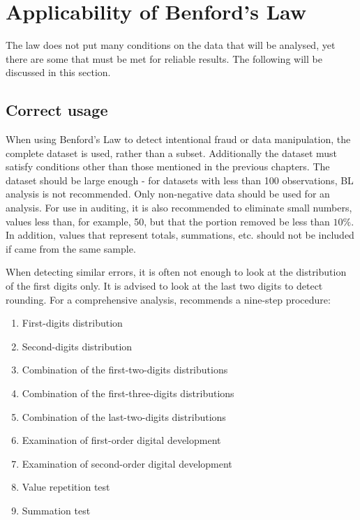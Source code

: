 \section{Applicability of Benford's Law}

The law does not put many conditions on the data that will be analysed, yet there are some that must be met for reliable results. The following will be discussed in this section. 

\subsection{Correct usage}

When using Benford's Law to detect intentional fraud or data manipulation, the complete dataset is used, rather than a subset. Additionally the dataset must satisfy conditions other than those mentioned in the previous chapters. The dataset should be large enough - for datasets with less than 100 observations, BL analysis is not recommended. %
Only non-negative data should be used for an analysis. For use in auditing, it is also recommended to eliminate small numbers, values less than, for example, 50, but that the portion removed be less than $10\%$. In addition, values that represent totals, summations, etc. should not be included if came from the same sample. \cite{kossovsky2014benford} %

When detecting similar errors, it is often not enough to look at the distribution of the first digits only. It is advised to look at the last two digits to detect rounding. For a comprehensive analysis, \citeauthor{kossovsky2014benford} recommends a nine-step procedure:

\begin{enumerate}
    \item First-digits distribution
    \item Second-digits distribution
    \item Combination of the first-two-digits distributions
    \item Combination of the first-three-digits distributions
    \item Combination of the last-two-digits distributions 
    \item Examination of first-order digital development
    \item Examination of second-order digital development
    \item Value repetition test
    \item Summation test   
\end{enumerate}

